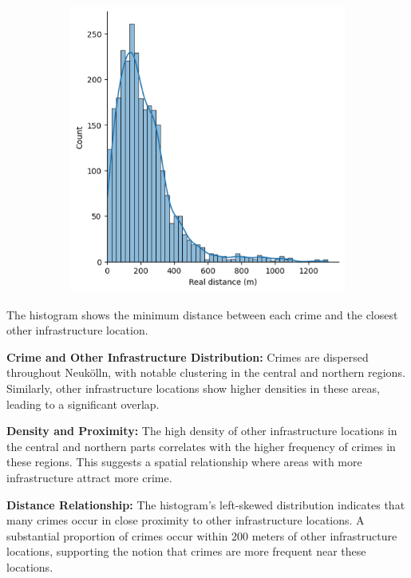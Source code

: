 \begin{figure}[h]
\begin{subfigure}[b]{0.45\textwidth}
        \includegraphics[width=\textwidth]{./figures/Gerard/others_1.png}
        \caption{}
        \label{fig:image2}
    \end{subfigure}

\end{figure}

The histogram shows the minimum distance between each crime and the closest other infrastructure location. 

 \textbf{Crime and Other Infrastructure Distribution:} Crimes are dispersed throughout Neukölln, with notable clustering in the central and northern regions. Similarly, other infrastructure locations show higher densities in these areas, leading to a significant overlap. 

 \textbf{Density and Proximity:} The high density of other infrastructure locations in the central and northern parts correlates with the higher frequency of crimes in these regions. This suggests a spatial relationship where areas with more infrastructure attract more crime. 

 \textbf{Distance Relationship:} The histogram's left-skewed distribution indicates that many crimes occur in close proximity to other infrastructure locations. A substantial proportion of crimes occur within 200 meters of other infrastructure locations, supporting the notion that crimes are more frequent near these locations. 

